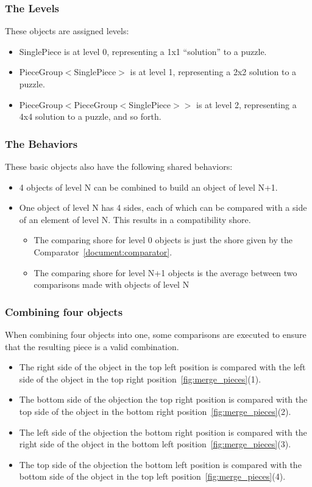 \documentclass{article}
\begin{document}
\subsubsection{The Levels}

These objects are assigned levels:
\begin{itemize}
\item SinglePiece is at level 0, representing a 1x1 ``solution'' to a puzzle.
\item PieceGroup\(<\)SinglePiece\(>\) is at level 1, representing a 2x2 solution to a puzzle.
\item PieceGroup\(<\)PieceGroup\(<\)SinglePiece\(>>\) is at level 2, representing a 4x4 solution to a puzzle, and so forth.
\end{itemize}

\subsubsection{The Behaviors}

These basic objects also have the following shared behaviors:
\begin{itemize}
  \item 4 objects of level N can be combined to build an object of level N+1.
  \item One object of level N has 4 sides, each of which can be compared with a side of an element of level N. This results in a compatibility shore.
  \begin{itemize}
    \item The comparing shore for level 0 objects is just the shore given by the Comparator~\ref{document:comparator}.
    \item The comparing shore for level N+1 objects is the average between two comparisons made with objects of level N
  \end{itemize}
\end{itemize}

\subsubsection{Combining four objects}\label{document:combining_four_objects}

When combining four objects into one, some comparisons are executed to ensure that the resulting piece is a valid  combination.
\begin{itemize}
  \item The right side of the object in the top left position is compared with the left side of the object in the top right position~\ref{fig:merge_pieces}(1).
  \item The bottom side of the objection the top right position is compared with the top side of the object in the bottom right position~\ref{fig:merge_pieces}(2).
  \item The left side of the objection the bottom right position is compared with the right side of the object in the bottom left position~\ref{fig:merge_pieces}(3).
  \item The top side of the objection the bottom left position is compared with the bottom side of the object in the top left position~\ref{fig:merge_pieces}(4).
\end{itemize}
\end{document}
